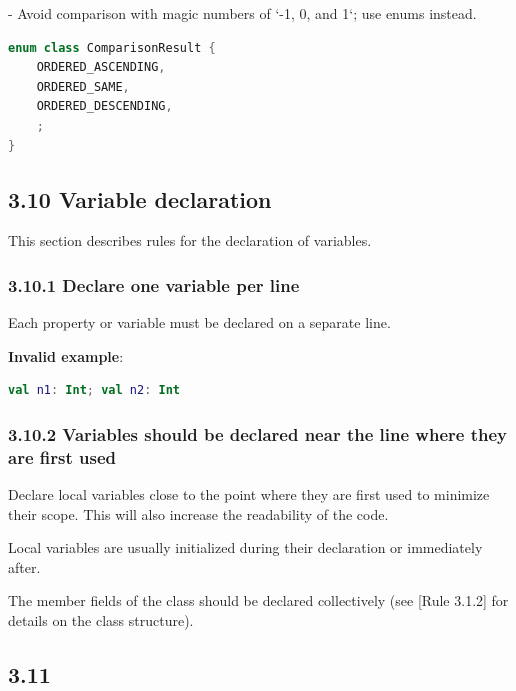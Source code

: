 {{{{- Avoid comparison with magic numbers of `-1, 0, and 1`; use enums instead.



\begin{lstlisting}[language=Kotlin]
enum class ComparisonResult {
    ORDERED_ASCENDING,
    ORDERED_SAME,
    ORDERED_DESCENDING,
    ;
}
\end{lstlisting}


\subsection*{\textbf{3.10 Variable declaration}}

This section describes rules for the declaration of variables.

\subsubsection*{\textbf{3.10.1 Declare one variable per line}}
\leavevmode\newline



Each property or variable must be declared on a separate line. 



\textbf{Invalid example}:

\begin{lstlisting}[language=Kotlin]
val n1: Int; val n2: Int
\end{lstlisting}


\subsubsection*{\textbf{3.10.2 Variables should be declared near the line where they are first used}}
\leavevmode\newline

Declare local variables close to the point where they are first used to minimize their scope. This will also increase the readability of the code.

Local variables are usually initialized during their declaration or immediately after.

The member fields of the class should be declared collectively (see [Rule 3.1.2] for details on the class structure).



\subsection*{\textbf{3.11}}



}}}}
